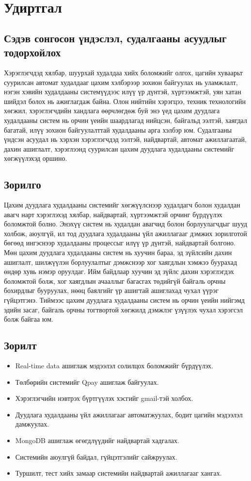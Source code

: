 \chapter{Удиртгал}
\newpage
\section{Сэдэв сонгосон үндэслэл, судалгааны асуудлыг тодорхойлох}
Хэрэглэгчдэд хялбар, шуурхай худалдаа хийх боломжийг олгох, цагийн хуваарьт суурилсан автомат худалдааг цахим хэлбэрээр зохион байгуулах нь уламжлалт, нэгэн хэвийн худалдааны системүүдээс илүү үр дүнтэй, хүртээмжтэй, уян хатан шийдэл болох нь ажиглагдаж байна. Олон нийтийн хэрэгцээ, техник технологийн хөгжил, хэрэглэгчдийн хандлага өөрчлөгдөж буй энэ үед цахим дуудлага худалдааны систем нь орчин үеийн шаардлагад нийцсэн, байгальд ээлтэй, хаягдал багатай, илүү зохион байгуулалттай худалдааны арга хэлбэр юм. Судалгааны үндсэн асуудал нь хэрхэн хэрэглэгчдэд ээлтэй, найдвартай, автомат ажиллагаатай, дахин ашиглалт, хэрэглээнд суурилсан цахим дуудлага худалдааны системийг хөгжүүлэхэд оршино.

\section{Зорилго}
Цахим дуудлага худалдааны системийг хөгжүүлснээр худалдагч болон худалдан авагч нарт хэрэглэхэд хялбар, найдвартай, хүртээмжтэй орчинг бүрдүүлэх боломжтой болно. Энэхүү систем нь худалдан авагчид болон борлуулагчдыг шууд холбож, аюулгүй, ил тод дуудлага худалдааны үйл ажиллагааг дэмжих зорилготой бөгөөд ингэснээр худалдааны процессыг илүү үр дүнтэй, найдвартай болгоно. Мөн цахим дуудлага худалдааны систем нь хуучин бараа, эд зүйлсийн дахин ашиглалт, шилжүүлэн борлуулалтыг дэмжснээр хог хаягдлын хэмжээ буурахад өндөр хувь нэмэр оруулдаг. Ийм байдлаар хуучин эд зүйлс дахин хэрэглэгдэх боломжтой болж, хог хаягдлын ачааллыг багасгах төдийгүй байгаль орчны бохирдлыг бууруулах, нөөц баялгийг үр ашигтай ашиглахад чухал үүрэг гүйцэтгэнэ. Тиймээс цахим дуудлага худалдааны систем нь орчин үеийн нийгэмд эдийн засаг, байгаль орчны тогтвортой хөгжилд дэмжлэг үзүүлэх чухал хэрэгсэл болж байгаа юм.

\section{Зорилт}
\begin{itemize}
    \item Real-time data ашиглаж мэдээлэл солилцох боломжийг бүрдүүлэх.
    \item Төлбөрийн системийг Qpay ашиглаж байгуулах.
    \item Хэрэглэгчийн нэвтрэх бүртгүүлэх хэсгийг gmail-тэй холбох.
    \item Дуудлага худалдааны үйл ажиллагааг автоматжуулах, бодит цагийн мэдээлэл дамжуулах.
    \item MongoDB ашиглаж өгөгдлүүдийг найдвартай хадгалах.
    \item Системийн аюулгүй байдал, гүйцэтгэлийг сайжруулах.
    \item Туршилт, тест хийх замаар системийн найдвартай ажиллагааг хангах.
\end{itemize}

